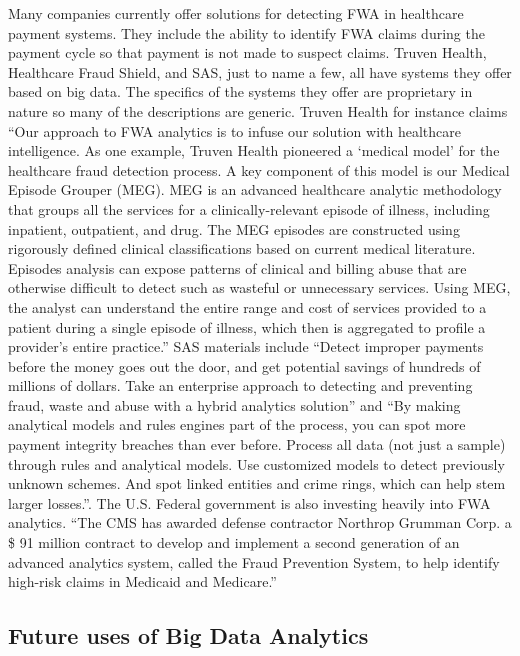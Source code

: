 \documentclass[sigconf]{acmart}
\begin{document}
Many companies currently offer solutions for detecting FWA in healthcare payment systems. 
They include the ability to identify FWA claims during the payment cycle so that payment 
is not made to suspect claims.  Truven Health\cite{TruvenHealth}, Healthcare Fraud Shield\cite{FraudShield}, 
and SAS\cite{SASHealth}, just to name a few, all have systems they offer based on big data.  The 
specifics of the systems they offer are proprietary in nature so many of the descriptions are 
generic.  Truven Health for instance claims ``Our approach to FWA analytics is to infuse our 
solution with healthcare intelligence.  As one example, Truven Health pioneered a `medical model' 
for the healthcare fraud detection process.  A key component of this model is our Medical Episode 
Grouper (MEG).  MEG is an advanced healthcare analytic methodology that groups all the services 
for a clinically-relevant episode of illness, including inpatient, outpatient, and drug.  The MEG 
episodes are constructed using rigorously defined clinical classifications based on current medical 
literature.  Episodes analysis can expose patterns of clinical and billing abuse that are otherwise 
difficult to detect such as wasteful or unnecessary services.  Using MEG, the analyst can understand 
the entire range and cost of services provided to a patient during a single episode of illness, 
which then is aggregated to profile a provider's entire practice.''\cite{TruvenHealth} SAS materials 
include ``Detect improper payments before the money goes out the door, and get potential savings of 
hundreds of millions of dollars. Take an enterprise approach to detecting and preventing fraud, waste 
and abuse with a hybrid analytics solution''\cite{SASHealth} and ``By making analytical models and 
rules engines part of the process, you can spot more payment integrity breaches than ever before. 
Process all data (not just a sample) through rules and analytical models. Use customized models to 
detect previously unknown schemes. And spot linked entities and crime rings, which can help stem 
larger losses.''\cite{SASFraud}.  The U.S. Federal government is also investing heavily into FWA 
analytics.  ``The CMS has awarded defense contractor Northrop Grumman Corp. a \$ 91 million contract 
to develop and implement a second generation of an advanced analytics system, called the Fraud 
Prevention System, to help identify high-risk claims in Medicaid and Medicare.''\cite{ModernHealthcare}

\subsection{Future uses of Big Data Analytics}
\end{document}
